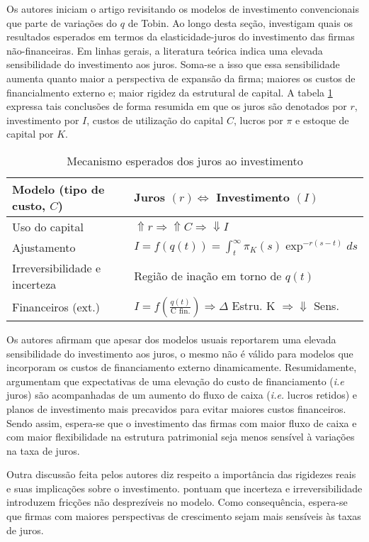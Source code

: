 \documentclass[11pt]{article}
\begin{document}
Os autores iniciam o artigo revisitando os modelos de investimento convencionais que parte de variações do \(q\) de Tobin.
Ao longo desta seção, investigam quais os resultados esperados em termos da elasticidade-juros do investimento das firmas não-financeiras.
Em linhas gerais, a literatura teórica indica uma elevada sensibilidade do investimento aos juros.
Soma-se a isso que essa sensibilidade aumenta quanto maior a perspectiva de expansão da firma; maiores os custos de financialmento externo e; maior rigidez da estrutural de capital.
A tabela \ref{tab:teorico} expressa tais conclusões de forma resumida em que os juros são denotados por \(r\), investimento por \(I\), custos de utilização do capital \(C\), lucros por \(\pi\) e estoque de capital por \(K\).


\begin{table}[htbp]
\caption{\label{tab:teorico}Mecanismo esperados dos juros ao investimento}
\centering
\begin{tabular}{ll}
\hline
Modelo (tipo de custo, \(C\)) & Juros \((r) \Leftrightarrow\) Investimento \((I)\)\\
\hline
Uso do capital & \(\Uparrow r \Rightarrow \Uparrow C \Rightarrow \Downarrow I\)\\
Ajustamento & \(I = f(q(t)) = \int_{t}^{{\infty}} \pi_{K}(s)\exp^{-r(s-t)}ds\)\\
Irreversibilidade e incerteza & Região de inação em torno de \(q(t)\)\\
Financeiros (ext.) & \(I = f\left(\frac{q(t)}{\text{C fin.}}\right) \Rightarrow \Delta\) Estru. K \(\Rightarrow \Downarrow\) Sens.\\
\hline
\end{tabular}
\end{table}


Os autores afirmam que apesar dos modelos usuais reportarem uma elevada sensibilidade do investimento aos juros, o mesmo não é válido para modelos que incorporam os custos de financiamento externo dinamicamente.
Resumidamente, argumentam que expectativas de uma elevação do custo de financiamento (\emph{i.e} juros) são acompanhadas de um aumento do fluxo de caixa (\emph{i.e.} lucros retidos) e planos de investimento mais precavidos para evitar maiores custos financeiros.
Sendo assim, espera-se que o investimento das firmas com maior fluxo de caixa e com maior flexibilidade na estrutura patrimonial seja menos sensível à variações na taxa de juros.

Outra discussão feita pelos autores diz respeito a importância das rigidezes reais e suas implicações sobre o investimento.
\textcite{sharpe_2020_Why} pontuam que incerteza e irreversibilidade introduzem fricções não desprezíveis no modelo.
Como consequência, espera-se que firmas com maiores perspectivas de crescimento sejam mais sensíveis às taxas de juros.
\end{document}
